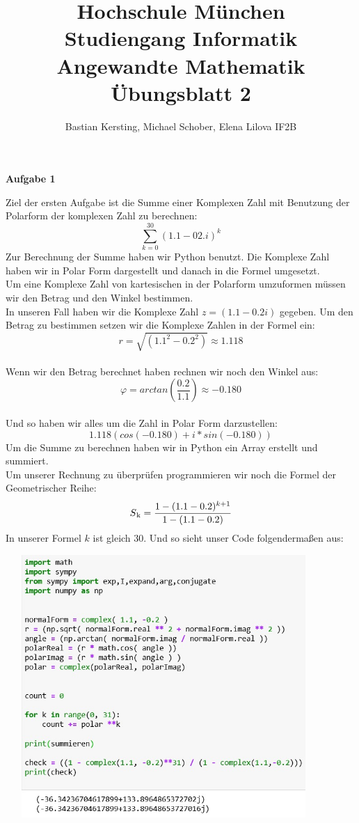 \documentclass[12pt,oneside,a4paper]{article}
\begin{document}
\title{\Large{\textbf{Hochschule München\\ 
Studiengang Informatik\\ 
\bigskip
\bigskip
\bigskip
\bigskip
\bigskip
\bigskip
Angewandte Mathematik\\
Übungsblatt 2}}}
\bigskip
\author{Bastian Kersting,
Michael Schober,
Elena Lilova
IF2B}
\maketitle
\newpage
\begin{center}
\LARGE
 \textbf{Aufgabe 1} 
\bigskip
\bigskip
\end{center}
\begin{flushleft}
Ziel der ersten Aufgabe ist die Summe einer Komplexen Zahl mit Benutzung der Polarform der komplexen Zahl zu berechnen: $$
\sum_{k=0}^{30} (1.1 - 02.i)^k $$ 
Zur Berechnung der Summe haben wir Python benutzt. Die Komplexe Zahl haben wir in Polar Form dargestellt und danach in die Formel umgesetzt. \\
Um eine Komplexe Zahl von kartesischen in der Polarform umzuformen müssen wir den Betrag und den Winkel bestimmen. \\
In unseren Fall haben wir die Komplexe Zahl $z=(1.1 - 0.2 i)$ gegeben.
Um den Betrag zu bestimmen setzen wir die Komplexe Zahlen in der Formel ein: $$r = \sqrt{(1.1^2 - 0.2^2)} \approx 1.118$$\\
Wenn wir den Betrag berechnet haben rechnen wir noch den Winkel aus: $$\varphi = arctan(\frac{0.2}{1.1}) \approx -0.180$$\\
Und so haben wir alles um die Zahl in Polar Form darzustellen: $$ 1.118(cos(-0.180) + i*sin(-0.180))$$
Um die Summe zu berechnen haben wir in Python ein Array erstellt und summiert. \\
Um unserer Rechnung zu überprüfen programmieren wir noch die Formel der Geometrischer Reihe: $$S\textsubscript{k} =\frac{1-(1.1-0.2)^{k+1}}{1-(1.1-0.2)}$$ \bigskip
In unserer Formel $k$ ist gleich $30$. 
Und so sieht unser Code folgendermaßen aus: 
\begin{center}
\includegraphics[width=12cm,height=10cm]{Capture}

\end{center}
\end{flushleft}
\end{document}
